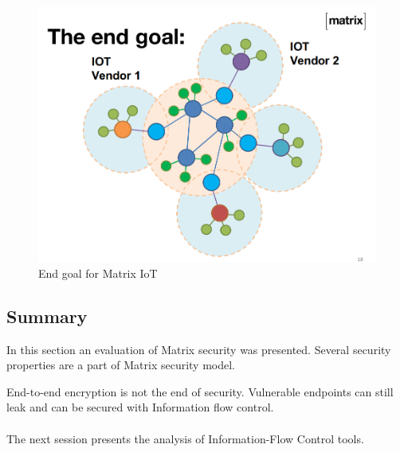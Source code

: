 \begin{figure}[H]
	\centering
	\includegraphics[width=12cm]{figures/matrix_iot.png}
	\caption{End goal for Matrix IoT}
	\label{fig:matrix_iot}
\end{figure}




\subsection{Summary}

In this section an evaluation of Matrix security was presented. Several security properties are a part of Matrix security model. 

End-to-end encryption is not the end of security. Vulnerable endpoints can still leak and can be secured with Information flow control.
\\
\\
The next session presents the analysis of Information-Flow Control tools.








